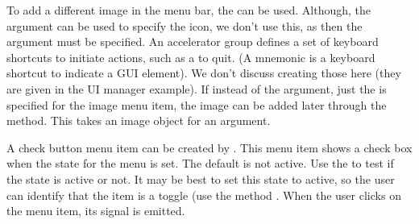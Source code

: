 To add a different image in the menu bar, the
 can be used. Although, the
 argument can be used to specify
the icon, we don't use this, as then the argument
 must be specified. An
accelerator group defines a set of keyboard shortcuts to initiate
actions, such as a  to quit. (A mnemonic is a keyboard
shortcut to indicate a GUI element). We don't discuss creating those
here (they are given in the UI manager example). If instead of the
 argument, just the  is specified for the
image menu item, the image can be added later through the
 method. This takes an image object
for an argument. 

A check button menu item can be created by
. This menu item shows a check box when
the  state for the menu is set. The default is not
active. Use the  to test if the
state is active or not.  It may be best to set this state to active,
so the user can identify that the item is a toggle (use the method
. When the user clicks on the menu item, its
 signal is emitted.

